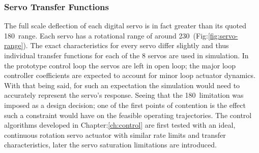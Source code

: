 \subsubsection*{Servo Transfer Functions}
The full scale deflection of each digital servo is in fact greater than its quoted 180\textdegree ~range. Each servo has a rotational range of around 230\textdegree ~(Fig:\ref{fig:servo-range}). The exact characteristics for every servo differ slightly and thus individual transfer functions for each of the 8 servos are used in simulation. In the prototype control loop the servos are left in open loop; the major loop controller coefficients are expected to account for minor loop actuator dynamics. With that being said, for such an expectation the simulation would need to accurately represent the servo's response. Seeing that the 180\textdegree ~limitation was imposed as a design decision; one of the first points of contention is the effect such a constraint would have on the feasible operating trajectories. The control algorithms developed in Chapter:\ref{ch:control} are first tested with an ideal, continuous rotation servo actuator with similar rate limits and transfer characteristics, later the servo saturation limitations are introduced.

